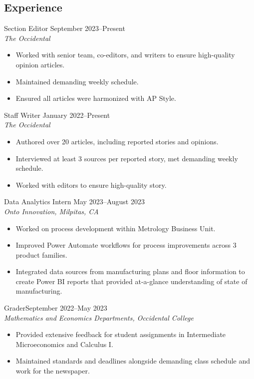 \documentclass[margin, 12pt]{res} %
\begin{document}
\begin{resume}
\section{\sc Experience}
Section Editor \hfill September 2023--Present \\
\textit{The Occidental}
\begin{itemize}\itemsep -2pt
  \item Worked with senior team, co-editors, and writers to ensure high-quality opinion articles.
  \item Maintained demanding weekly schedule.
  \item Ensured all articles were harmonized with AP Style.
\end{itemize}
Staff Writer \hfill January 2022--Present \\
\textit{The Occidental} 
\begin{itemize} \itemsep -2pt
\item Authored over 20 articles, including reported stories and opinions.
\item Interviewed at least 3 sources per reported story, met demanding weekly schedule.
\item Worked with editors to ensure high-quality story.
\end{itemize} 
{Data Analytics Intern} \hfill May 2023--August 2023 \\
\textit{Onto Innovation, Milpitas, CA}
\begin{itemize} \itemsep -2pt %
\item Worked on process development within Metrology Business Unit.
\item Improved Power Automate workflows for process improvements across 3 product families.
\item Integrated data sources from manufacturing plans and floor information to create Power BI reports that provided at-a-glance understanding of state of manufacturing.
\end{itemize}
 


Grader\hfill September 2022--May 2023\\
\textit{Mathematics and Economics Departments, Occidental College}
\begin{itemize}\itemsep -2pt
  \item Provided extensive feedback for student assignments in Intermediate Microeconomics and Calculus I.
  \item Maintained standards and deadlines alongside demanding class schedule and work for the newspaper.
\end{itemize}


\end{resume}
\end{document}
